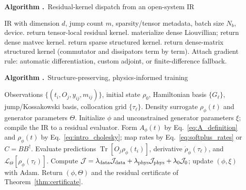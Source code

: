 \documentclass[twocolumn,aps,prxquantum,superscriptaddress,nofootinbib,floatfix,longbibliography]{revtex4-2}
\DeclareMathOperator{\Tr}{Tr}
\newcommand{\calJ}{\mathcal{J}}
\newcommand{\calL}{\mathcal{L}}
\newcommand{\rhophi}{\rho_{\phi}}
\begin{document}
\onecolumngrid
\medskip
\noindent\hrulefill\par\vspace{-1.5ex}
\label{alg:dispatch}%
\noindent\textbf{Algorithm \thealgorithm.}~Residual-kernel dispatch from an open-system IR
\begin{algorithmic}[1]
\REQUIRE IR with dimension $d$, jump count $m$, sparsity/tensor metadata, batch size $N_b$, device.
    \STATE return tensor-local residual kernel.
    \STATE materialize dense Liouvillian; return dense matvec kernel.
    \STATE return sparse structured kernel.
\ELSE
    \STATE return dense-matrix structured kernel (commutator and dissipators term by term).
\ENDIF
\STATE Attach gradient rule: automatic differentiation, custom adjoint, or finite-difference fallback.
\end{algorithmic}

\medskip
\noindent\hrulefill\par\vspace{-1.5ex}
\label{alg:cptp_compiler_pinn}%
\noindent\textbf{Algorithm \thealgorithm.}~Structure-preserving, physics-informed training
\begin{algorithmic}[1]
\REQUIRE Observations $\{(t_i,O_j,y_{ij},m_{ij})\}$, initial state $\rho_0$, Hamiltonian basis $\{G_\ell\}$, jump/Kossakowski basis, collocation grid $\{\tau_\ell\}$.
\ENSURE Density surrogate $\rhophi(t)$ and generator parameters $\Theta$.
\STATE Initialize $\phi$ and unconstrained generator parameters $\xi$; compile the IR to a residual evaluator.
    \STATE Form $A_\phi(t)$ by Eq.~\eqref{eq:A_definition} and $\rhophi(t)$ by Eq.~\eqref{eq:intro_cholesky}; map rates by Eq.~\eqref{eq:softplus_rates} or $C=BB^\dagger$.
    \STATE Evaluate predictions $\Tr[O_j\rhophi(t_i)]$, derivative $\dot\rhophi(\tau_\ell)$, and $\calL_\Theta[\rhophi(\tau_\ell)]$.
    \STATE Compute $\calJ=\lambda_{\rm data}\calJ_{\rm data}+\lambda_{\rm phys}\calJ_{\rm phys}+\lambda_0\calJ_0$; update $(\phi,\xi)$ with Adam.
\ENDFOR
\STATE Return $(\phi,\Theta)$ and the residual certificate of Theorem~\ref{thm:certificate}.
\end{algorithmic}
\end{document}
